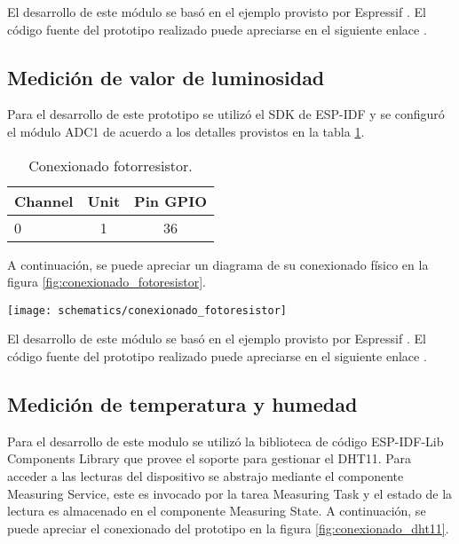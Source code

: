 El desarrollo de este módulo se basó en el ejemplo provisto por Espressif \cite{ESP32_ADC1_Example}. El código fuente del prototipo realizado puede apreciarse en el siguiente enlace \cite{ESP32_POC_joystick}.


\subsection{Medición de valor de luminosidad}
Para el desarrollo de este prototipo se utilizó el SDK de ESP-IDF y se configuró el módulo ADC1 de acuerdo a los detalles provistos en la tabla \ref{tab:conexionado_fotoresistor}. 

\vspace{0.5cm}
\begin{table}[h]
\centering
\caption[Conexionado fotoresistor]{Conexionado fotorresistor.}
\begin{tabular}{l c c}
\toprule
\textbf{Channel} & \textbf{Unit} & \textbf{Pin GPIO}\\
\midrule
0 & 1 & 36 \\
\bottomrule
\hline
\end{tabular}
\label{tab:conexionado_fotoresistor}
\end{table}

A continuación, se puede apreciar un diagrama de su conexionado físico en la figura \ref{fig:conexionado_fotoresistor}.

\begin{center}
\texttt{[image: schematics/conexionado\_fotoresistor]}
  \label{fig:conexionado_fotoresistor}
\end{center}

El desarrollo de este módulo se basó en el ejemplo provisto por Espressif \cite{ESP32_ADC1_Example}. El código fuente del prototipo realizado puede apreciarse en el siguiente enlace \cite{ESP32_POC_photoresistor}.

\subsection{Medición de temperatura y humedad}

Para el desarrollo de este modulo se utilizó la biblioteca de código ESP-IDF-Lib Components Library \cite{esp_idf_lib_website} que provee el soporte para gestionar el DHT11. Para acceder a las lecturas del dispositivo se abstrajo mediante el componente Measuring Service, este es invocado por la tarea Measuring Task y el estado de la lectura es almacenado en el componente Measuring State.
A continuación, se puede apreciar el conexionado del prototipo en la figura \ref{fig:conexionado_dht11}.

